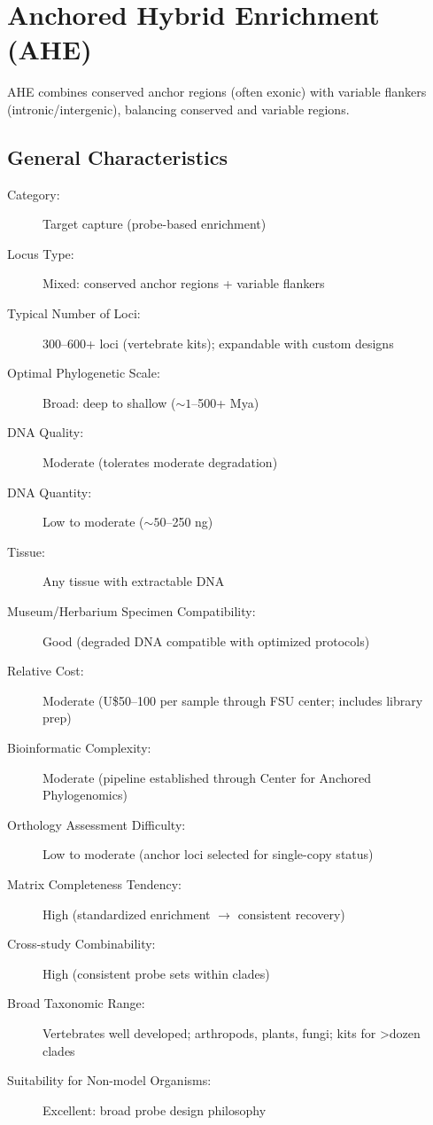 \textcite{faircloth2012, mccormack2013, zhang2019, branstetter2017}

\section{Anchored Hybrid Enrichment (AHE)}

AHE combines conserved anchor regions (often exonic) with variable flankers (intronic/intergenic), balancing conserved and variable regions.

\subsection{General Characteristics}

\begin{description}
\item[Category:] Target capture (probe-based enrichment)
\item[Locus Type:] Mixed: conserved anchor regions + variable flankers
\item[Typical Number of Loci:] 300--600+ loci (vertebrate kits); expandable with custom designs
\item[Optimal Phylogenetic Scale:] Broad: deep to shallow (\(\sim 1\)--500+ Mya)
\item[DNA Quality:] Moderate (tolerates moderate degradation)
\item[DNA Quantity:] Low to moderate (\(\sim 50\)--250 ng)
\item[Tissue:] Any tissue with extractable DNA
\item[Museum/Herbarium Specimen Compatibility:] Good (degraded DNA compatible with optimized protocols)
\item[Relative Cost:] Moderate (U\$50--100 per sample through FSU center; includes library prep)
\item[Bioinformatic Complexity:] Moderate (pipeline established through Center for Anchored Phylogenomics)
\item[Orthology Assessment Difficulty:] Low to moderate (anchor loci selected for single-copy status)
\item[Matrix Completeness Tendency:] High (standardized enrichment $\rightarrow$ consistent recovery)
\item[Cross-study Combinability:] High (consistent probe sets within clades)
\item[Broad Taxonomic Range:] Vertebrates well developed; arthropods, plants, fungi; kits for >dozen clades
\item[Suitability for Non-model Organisms:] Excellent: broad probe design philosophy
\end{description}

